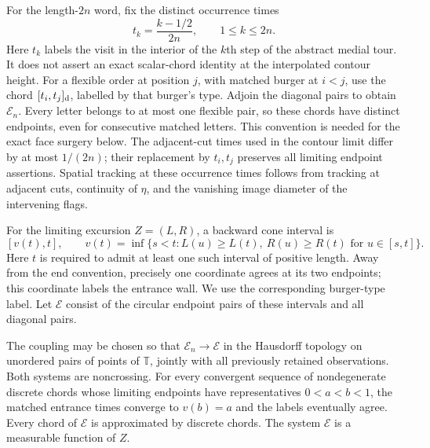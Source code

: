 For the length-$2n$ word, fix the distinct occurrence times
\[
 t_k=\frac{k-1/2}{2n},\qquad 1\le k\le2n.
\]
Here $t_k$ labels the visit in the interior of the $k$th step of the
abstract medial tour.  It does not assert an exact scalar-chord identity
at the interpolated contour height.  For a flexible order at position
$j$, with matched burger at $i<j$, use the chord $[t_i,t_j]_{\rm d}$,
labelled by that burger's type.  Adjoin the diagonal pairs to obtain
$\mathcal E_n$.  Every letter belongs to at most one flexible pair,
so these chords have distinct endpoints, even for consecutive matched
letters.  This convention is needed for the exact face surgery below.
The adjacent-cut times used in the contour limit differ by at most
$1/(2n)$; their replacement by $t_i,t_j$ preserves all limiting
endpoint assertions.  Spatial tracking at these occurrence times
follows from tracking at adjacent cuts, continuity of $\eta$, and
the vanishing image diameter of the intervening flags.

For the limiting excursion $Z=(L,R)$, a backward cone interval is
\[
 [v(t),t],\qquad
 v(t)=\inf\{s<t:L(u)\ge L(t),\ R(u)\ge R(t)
                         \text{ for }u\in[s,t]\}.
\]
Here $t$ is required to admit at least one such interval of positive
length.  Away from the end convention, precisely one coordinate agrees
at its two endpoints; this coordinate labels the entrance wall.  We use
the corresponding burger-type label.  Let $\mathcal E$ consist of the
circular endpoint pairs of these intervals and all diagonal pairs.

\begin{lemma}\label{loop:chords}
The coupling may be chosen so that $\mathcal E_n\to\mathcal E$ in the
Hausdorff topology on unordered pairs of points of $\mathbb T$, jointly
with all previously retained observations.  Both systems are noncrossing.
For every convergent sequence of nondegenerate discrete chords whose
limiting endpoints have representatives $0<a<b<1$, the matched entrance
times converge to $v(b)=a$ and the labels eventually agree.  Every chord
of $\mathcal E$ is approximated by discrete chords.  The system
$\mathcal E$ is a measurable function of $Z$.
\end{lemma}

